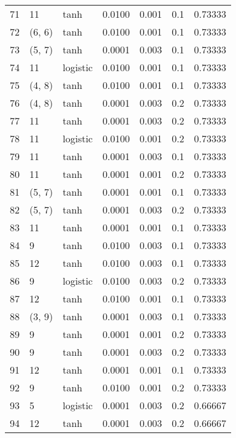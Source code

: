 \begin{tabular}{lllrrrr}
71  &          11 &      tanh &  0.0100 &  0.001 &  0.1 &   0.73333 \\
72  &      (6, 6) &      tanh &  0.0100 &  0.001 &  0.1 &   0.73333 \\
73  &      (5, 7) &      tanh &  0.0001 &  0.003 &  0.1 &   0.73333 \\
74  &          11 &  logistic &  0.0100 &  0.001 &  0.1 &   0.73333 \\
75  &      (4, 8) &      tanh &  0.0100 &  0.001 &  0.1 &   0.73333 \\
76  &      (4, 8) &      tanh &  0.0001 &  0.003 &  0.2 &   0.73333 \\
77  &          11 &      tanh &  0.0001 &  0.003 &  0.2 &   0.73333 \\
78  &          11 &  logistic &  0.0100 &  0.001 &  0.2 &   0.73333 \\
79  &          11 &      tanh &  0.0001 &  0.003 &  0.1 &   0.73333 \\
80  &          11 &      tanh &  0.0001 &  0.001 &  0.2 &   0.73333 \\
81  &      (5, 7) &      tanh &  0.0001 &  0.001 &  0.1 &   0.73333 \\
82  &      (5, 7) &      tanh &  0.0001 &  0.003 &  0.2 &   0.73333 \\
83  &          11 &      tanh &  0.0001 &  0.001 &  0.1 &   0.73333 \\
84  &           9 &      tanh &  0.0100 &  0.003 &  0.1 &   0.73333 \\
85  &          12 &      tanh &  0.0100 &  0.003 &  0.1 &   0.73333 \\
86  &           9 &  logistic &  0.0100 &  0.003 &  0.2 &   0.73333 \\
87  &          12 &      tanh &  0.0100 &  0.001 &  0.1 &   0.73333 \\
88  &      (3, 9) &      tanh &  0.0001 &  0.003 &  0.1 &   0.73333 \\
89  &           9 &      tanh &  0.0001 &  0.001 &  0.2 &   0.73333 \\
90  &           9 &      tanh &  0.0001 &  0.003 &  0.2 &   0.73333 \\
91  &          12 &      tanh &  0.0001 &  0.001 &  0.1 &   0.73333 \\
92  &           9 &      tanh &  0.0100 &  0.001 &  0.2 &   0.73333 \\
93  &           5 &  logistic &  0.0001 &  0.003 &  0.2 &   0.66667 \\
94  &          12 &      tanh &  0.0001 &  0.003 &  0.2 &   0.66667 \\

\end{tabular}
